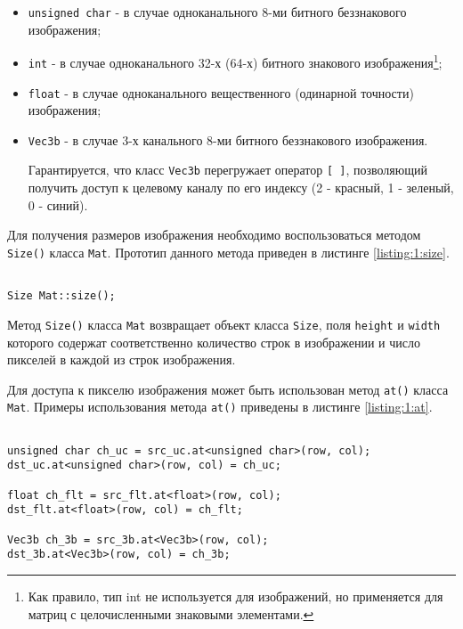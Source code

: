 \begin{itemize}

	\item \verb|unsigned char| - в случае одноканального 8-ми битного беззнакового изображения;
	\item \verb|int| - в случае одноканального 32-х (64-х) битного знакового изображения\footnote{Как правило, тип int не используется для изображений, но применяется для матриц с целочисленными знаковыми элементами.};
	\item \verb|float| - в случае одноканального вещественного (одинарной точности) изображения;
	\item \verb|Vec3b| - в случае 3-х канального 8-ми битного беззнакового изображения.

	Гарантируется, что класс \verb|Vec3b| перегружает оператор \verb|[ ]|, позволяющий получить доступ к целевому каналу по его индексу (2 - красный, 1 - зеленый, 0 - синий).

\end{itemize}

Для получения размеров изображения необходимо воспользоваться методом \verb|Size()| класса \verb|Mat|. Прототип данного метода приведен в листинге \ref{listing:1:size}.

\begin{lstlisting}

Size Mat::size();

\end{lstlisting}
\mylistingend

Метод \verb|Size()| класса \verb|Mat| возвращает объект класса \verb|Size|, поля \verb|height| и \verb|width| которого содержат соответственно количество строк в изображении и число пикселей в каждой из строк изображения.

Для доступа к пикселю изображения может быть использован метод \verb|at()| класса \verb|Mat|. Примеры использования метода \verb|at()| приведены в листинге \ref{listing:1:at}.

\begin{lstlisting}

unsigned char ch_uc = src_uc.at<unsigned char>(row, col);
dst_uc.at<unsigned char>(row, col) = ch_uc;

float ch_flt = src_flt.at<float>(row, col);
dst_flt.at<float>(row, col) = ch_flt;

Vec3b ch_3b = src_3b.at<Vec3b>(row, col);
dst_3b.at<Vec3b>(row, col) = ch_3b;

\end{lstlisting}
\mylistingend

